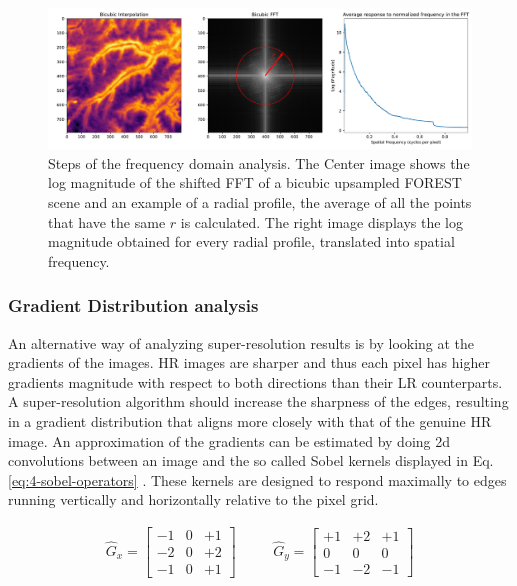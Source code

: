         \begin{figure}[h!]
            \centering
            \includegraphics[width=\linewidth]{Includes/4-frequency-analysis.pdf}
            \caption{Steps of the frequency domain analysis. The Center image shows the log magnitude of the shifted FFT of a bicubic upsampled FOREST scene and an example of a radial profile, the average of all the points that have the same $r$ is calculated. The right image displays the log magnitude obtained for every radial profile, translated into spatial frequency.  }
            \label{fig:4-frequency-analysis}
        \end{figure}

        \subsubsection{Gradient Distribution analysis}


        An alternative way of analyzing super-resolution results is by looking at the gradients of the images. HR images are sharper and thus each pixel has higher gradients magnitude with respect to both directions than their LR counterparts. A super-resolution algorithm should increase the sharpness of the edges, resulting in a gradient distribution that aligns more closely with that of the genuine HR image. An approximation of the gradients can be estimated by doing 2d convolutions between an image and the so called Sobel kernels displayed in Eq. \ref{eq:4-sobel-operators} \cite{Sobel1990AnI3}. These kernels are designed to respond maximally to edges running vertically and horizontally relative to the pixel grid.
        
        \begin{equation}
            \begin{array}{ccc}
            \hat{G}_x = \begin{bmatrix}
            -1 & 0 & +1 \\
            -2 & 0 & +2 \\
            -1 & 0 & +1
            \end{bmatrix}
            &
            \quad
            &
            \hat{G}_y = \begin{bmatrix}
            +1 & +2 & +1 \\
             0 &  0 &  0 \\
            -1 & -2 & -1
            \end{bmatrix}
            \end{array}
            \label{eq:4-sobel-operators}
        \end{equation}
    
